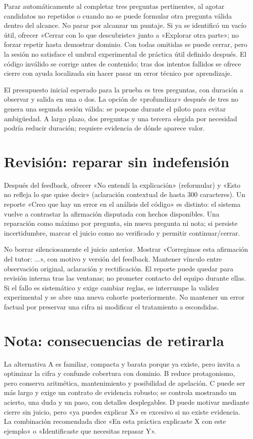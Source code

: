 \documentclass[11pt,a4paper]{report}
\begin{document}
Parar automáticamente al completar tres preguntas pertinentes, al agotar candidatos no repetidos o cuando no se puede formular otra pregunta válida dentro del alcance. No parar por alcanzar un puntaje. Si ya se identificó un vacío útil, ofrecer «Cerrar con lo que descubriste» junto a «Explorar otra parte»; no forzar repetir hasta demostrar dominio. Con todas omitidas se puede cerrar, pero la sesión no satisface el umbral experimental de práctica útil definido después. El código inválido se corrige antes de contenido; tras dos intentos fallidos se ofrece cierre con ayuda localizada sin hacer pasar un error técnico por aprendizaje.

El presupuesto inicial esperado para la prueba es tres preguntas, con duración a observar y salida en una o dos. La opción de «profundizar» después de tres no genera una segunda sesión válida: se pospone durante el piloto para evitar ambigüedad. A largo plazo, dos preguntas y una tercera elegida por necesidad podría reducir duración; requiere evidencia de dónde aparece valor.

\section{Revisión: reparar sin indefensión}
Después del feedback, ofrecer «No entendí la explicación» (reformular) y «Esto no refleja lo que quise decir» (aclaración contextual de hasta 300 caracteres). Un reporte «Creo que hay un error en el análisis del código» es distinto: el sistema vuelve a contrastar la afirmación disputada con hechos disponibles. Una reparación como máximo por pregunta, sin nueva pregunta ni nota; si persiste incertidumbre, marcar el juicio como no verificado y permitir continuar/cerrar.

No borrar silenciosamente el juicio anterior. Mostrar «Corregimos esta afirmación del tutor: ...», con motivo y versión del feedback. Mantener vínculo entre observación original, aclaración y rectificación. El reporte puede quedar para revisión interna tras las ventanas; no prometer contacto del equipo durante ellas. Si el fallo es sistemático y exige cambiar reglas, se interrumpe la validez experimental y se abre una nueva cohorte posteriormente. No mantener un error factual por preservar una cifra ni modificar el tratamiento a escondidas.

\section{Nota: consecuencias de retirarla}
La alternativa A es familiar, compacta y barata porque ya existe, pero invita a optimizar la cifra y confunde cobertura con dominio. B reduce protagonismo, pero conserva aritmética, mantenimiento y posibilidad de apelación. C puede ser más largo y exige un contrato de evidencia robusto; se controla mostrando un acierto, una duda y un paso, con detalles desplegables. D puede motivar mediante cierre sin juicio, pero «ya puedes explicar X» es excesivo si no existe evidencia. La combinación recomendada dice «En esta práctica explicaste X con este ejemplo» o «Identificaste que necesitas repasar Y».
\end{document}
